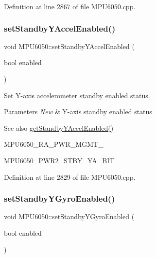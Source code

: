 Definition at line 2867 of file M\+P\+U6050.\+cpp.

\mbox{\label{classMPU6050_a7ce7d3299479eb66518acf0697132835}} 
\subsubsection{\texorpdfstring{setStandbyYAccelEnabled()}{setStandbyYAccelEnabled()}}
{\footnotesize\ttfamily void M\+P\+U6050\+::set\+Standby\+Y\+Accel\+Enabled (\begin{DoxyParamCaption}\item[{bool}]{enabled }\end{DoxyParamCaption})}



Set Y-\/axis accelerometer standby enabled status. 


\begin{DoxyParams}{Parameters}
{\em New} & Y-\/axis standby enabled status \\
\hline
\end{DoxyParams}
\begin{DoxySeeAlso}{See also}
\mbox{\hyperlink{classMPU6050_a104f2ec438d745f8fdeec202bae09b48}{get\+Standby\+Y\+Accel\+Enabled()}} 

M\+P\+U6050\+\_\+\+R\+A\+\_\+\+P\+W\+R\+\_\+\+M\+G\+M\+T\+\_ 

M\+P\+U6050\+\_\+\+P\+W\+R2\+\_\+\+S\+T\+B\+Y\+\_\+\+Y\+A\+\_\+\+B\+IT 
\end{DoxySeeAlso}


Definition at line 2829 of file M\+P\+U6050.\+cpp.

\mbox{\label{classMPU6050_ab0973d64b7132188539b07991f7ea1f0}} 
\subsubsection{\texorpdfstring{setStandbyYGyroEnabled()}{setStandbyYGyroEnabled()}}
{\footnotesize\ttfamily void M\+P\+U6050\+::set\+Standby\+Y\+Gyro\+Enabled (\begin{DoxyParamCaption}\item[{bool}]{enabled }\end{DoxyParamCaption})}



